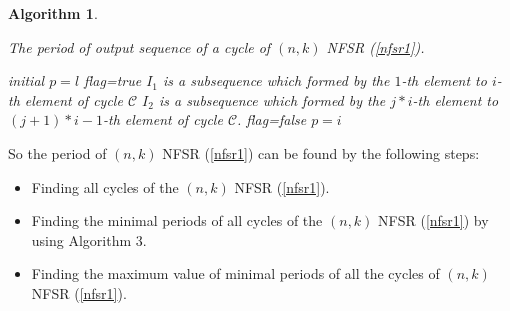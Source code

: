 \documentclass[conference]{IEEEtran}
\newtheorem{algorithm}{Algorithm}
\begin{document}

\begin{algorithm}\label{algorithm2}
\caption{The period of output sequence of a cycle of $(n,k)$ NFSR (\ref{nfsr1}).}
\begin{algorithmic}[2]
\STATE initial $p=l$
\STATE flag=true
\STATE $I_1$ is a subsequence which formed by the $1$-th element to $i$-th element of cycle $\mathcal{C}$
\STATE $I_2$ is a subsequence which formed by the $j\ast i$-th element to $(j+1)\ast i-1$-th element of cycle $\mathcal{C}$.
\STATE flag=false
\ENDIF
\ENDFOR
\ENDIF
{}
\STATE $p=i$
\ENDIF
\ENDIF
\ENDFOR
\end{algorithmic}
\end{algorithm}

So the period of $(n,k)$ NFSR (\ref{nfsr1}) can be found by the following steps:
\begin{itemize}\label{period}
  \item Finding all cycles of the $(n,k)$ NFSR (\ref{nfsr1}).
  \item Finding the minimal periods of all cycles of the $(n,k)$ NFSR (\ref{nfsr1}) by using Algorithm 3.
  \item Finding the maximum value of minimal periods of all the cycles of $(n,k)$ NFSR (\ref{nfsr1}).
\end{itemize}
\end{document}
